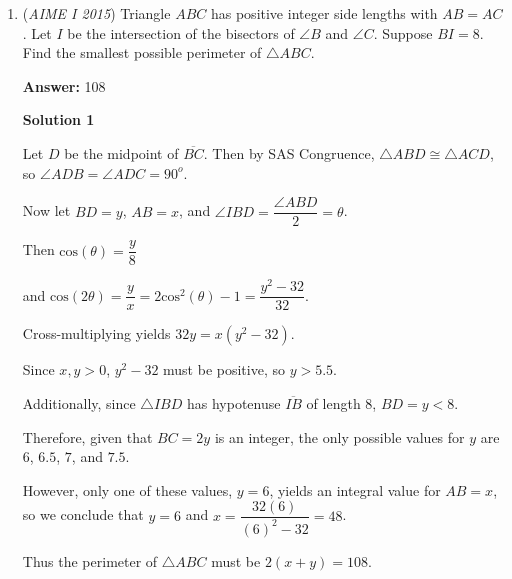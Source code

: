 \begin{enumerate}
 \textbf{2015 AIME I Q10}

 Let $f(x) = c(x-1)(x-5)(x-6) + 12$ and $f(x) = c(x-2)(x-3)(x-7) - 12$. Then, we have $30c + 12 = 42c - 12$, so $c = 2$. Then, $f(0) = 2(30) + 12 = 60 + 12 = \boxed{72}$.

 \textbf{Remark:}

 There is an alternate approach for the final that is much longer but also yields the same result, which is Lagrange Interpolation on four of the given six points. This is also used to justify the functions existence.

 


	\item (\textit{AIME I 2015}) Triangle $ABC$ has positive integer side lengths with $AB=AC$. Let $I$ be the intersection of the bisectors of $\angle B$ and $\angle C$. Suppose $BI=8$. Find the smallest possible perimeter of $\triangle ABC$.


 



 
 \textbf{Answer: }108



\textbf{Solution 1}

Let $D$ be the midpoint of $\overline{BC}$. Then by SAS Congruence, $\triangle ABD \cong \triangle ACD$, so $\angle ADB = \angle ADC = 90^o$.

 Now let $BD=y$, $AB=x$, and $\angle IBD = \dfrac{\angle ABD}{2} = \theta$.

 Then $\mathrm{cos}{(\theta)} = \dfrac{y}{8}$

 and $\mathrm{cos}{(2\theta)} = \dfrac{y}{x} = 2\mathrm{cos^2}{(\theta)} - 1 = \dfrac{y^2-32}{32}$.

 Cross-multiplying yields $32y = x(y^2-32)$.

 Since $x,y>0$, $y^2-32$ must be positive, so $y > 5.5$.

 Additionally, since $\triangle IBD$ has hypotenuse $\overline{IB}$ of length $8$, $BD=y < 8$.

 Therefore, given that $BC=2y$ is an integer, the only possible values for $y$ are $6$, $6.5$, $7$, and $7.5$.

 However, only one of these values, $y=6$, yields an integral value for $AB=x$, so we conclude that $y=6$ and $x=\dfrac{32(6)}{(6)^2-32}=48$.

 Thus the perimeter of $\triangle ABC$ must be $2(x+y) = \boxed{108}$.

 




\end{enumerate}
